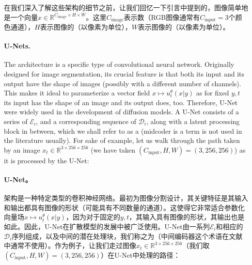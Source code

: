 在我们深入了解这些架构的细节之前，让我们回忆一下引言中提到的，图像简单地是一个向量$x \in \mathbb{R}^{C_{\text{image}} \times H \times W}$。这里$C_{\text{image}}$表示数（RGB图像通常有$C_{\text{input}} = 3$个颜色通道），$H$表示图像的（以像素为单位），$W$表示图像的（以像素为单位）。%

\paragraph{U-Nets.} The  architecture \citep{ronneberger2015u} is a specific type of convolutional neural network. Originally designed for image segmentation, its crucial feature is that both its input and its output have the shape of images (possibly with a different number of channels). This makes it ideal to parameterize a vector field $x\mapsto u_t^\theta(x|y)$ as for fixed $y,t$ its input has the shape of an image and its output does, too. Therefore, U-Net were widely used in the development of diffusion models. A U-Net consists of a series of  $\mathcal{E}_i$, and a corresponding sequence of  $\mathcal{D}_i$, along with a latent processing block in between, which we shall refer to as a  (midcoder is a term is not used in the literature usually). For sake of example, let us walk through the path taken by an image $x_t \in \mathbb{R}^{3 \times 256 \times 256}$ (we have taken $(C_{\text{input}}, H, W) = (3, 256, 256)$) as it is processed by the U-Net:
\paragraph{U-Net。} 架构\citep{ronneberger2015u}是一种特定类型的卷积神经网络。最初为图像分割设计，其关键特征是其输入和输出都具有图像的形状（可能具有不同数量的通道）。这使得它非常适合参数化向量场$x\mapsto u_t^\theta(x|y)$，因为对于固定的$y,t$，其输入具有图像的形状，其输出也是如此。因此，U-Net在扩散模型的发展中被广泛使用。U-Net由一系列$\mathcal{E}_i$和相应的$\mathcal{D}_i$序列组成，以及中间的潜在处理块，我们称之为（中间编码器这个术语在文献中通常不使用）。作为例子，让我们走过图像$x_t \in \mathbb{R}^{3 \times 256 \times 256}$（我们取$(C_{\text{input}}, H, W) = (3, 256, 256)$）在U-Net中处理的路径：

